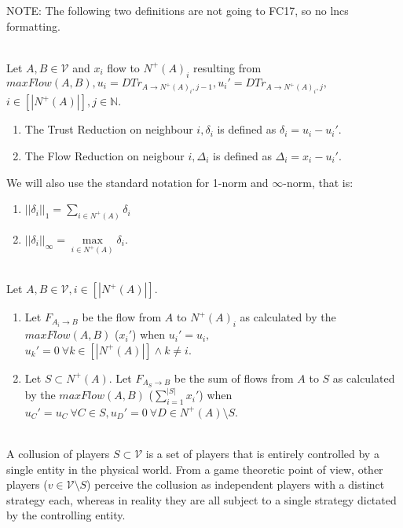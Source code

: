 \documentclass[11pt]{llncs}
\begin{document}
NOTE: The following two definitions are not going to FC17, so no lncs formatting.
     \begin{definition} \ \\
        Let $A, B \in \mathcal{V}$ and $x_i$ flow to $N^{+}(A)_i$ resulting from $maxFlow(A,B), u_i =
        DTr_{A \rightarrow N^{+}(A)_i,j-1}, u_i' = DTr_{A \rightarrow N^{+}(A)_i,j},$ \\ $i \in [|N^{+}(A)|],
        j \in \mathbb{N}$.
        \begin{enumerate}
           \item The Trust Reduction on neighbour $i, \delta_i$ is defined as $\delta_i = u_i - u_i'$.
           \item The Flow Reduction on neigbour $i, \Delta_i$ is defined as $\Delta_i = x_i - u_i'$.
        \end{enumerate}
        We will also use the standard notation for 1-norm and $\infty$-norm, that is:
        \begin{enumerate}
           \item $||\delta_i||_1 = \sum\limits_{i \in N^{+}(A)}\delta_i$
           \item $||\delta_i||_\infty = \max\limits_{i \in N^{+}(A)}\delta_i$.
        \end{enumerate}
     \end{definition}
     \begin{definition} \ \\
        Let $A, B \in \mathcal{V}, i \in [|N^{+}(A)|]$.
        \begin{enumerate}
           \item Let $F_{A_i \rightarrow B}$ be the flow from $A$ to $N^{+}(A)_i$ as calculated by the $maxFlow(A,B)$
              ($x_i'$) when $u_i' = u_i,$ \\ $u_k' = 0 \:\forall k \in [|N^{+}(A)|] \wedge k \neq i$.
           \item Let $S \subset N^{+}(A)$. Let $F_{A_S \rightarrow B}$ be the sum of flows from $A$ to $S$ as
              calculated by the $maxFlow(A,B)$ ($\sum\limits_{i=1}^{|S|}x_i'$) when $u_C' = u_C \: \forall C \in S,
              u_D' = 0 \: \forall D \in N^{+}(A) \setminus S$.
        \end{enumerate}
     \end{definition}
     \begin{definition}[Collusion] \ \\
        A collusion of players $S \subset \mathcal{V}$ is a set of players that is entirely controlled by a single entity in
        the physical world. From a game theoretic point of view, other players ($v \in \mathcal{V} \setminus S$) perceive
        the collusion as independent players with a distinct strategy each, whereas in reality they are all subject to a
        single strategy dictated by the controlling entity.
     \end{definition}
\end{document}
